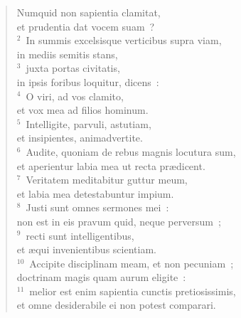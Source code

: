\begin{flushleft}\begin{verse}\vspace{-19pt}Numquid non sapientia clamitat,\\ et prudentia dat vocem suam~?\\
${}^{2}$~In summis excelsisque verticibus supra viam,\\ in mediis semitis stans,\\
${}^{3}$~juxta portas civitatis,\\ in ipsis foribus loquitur, dicens~:\\
${}^{4}$~O viri, ad vos clamito,\\ et vox mea ad filios hominum.\\
${}^{5}$~Intelligite, parvuli, astutiam,\\ et insipientes, animadvertite.\\
${}^{6}$~Audite, quoniam de rebus magnis locutura sum,\\ et aperientur labia mea ut recta pr\ae dicent.\\
${}^{7}$~Veritatem meditabitur guttur meum,\\ et labia mea detestabuntur impium.\\
${}^{8}$~Justi sunt omnes sermones mei~:\\ non est in eis pravum quid, neque perversum~;\\
${}^{9}$~recti sunt intelligentibus,\\ et \ae qui invenientibus scientiam.\\
${}^{10}$~Accipite disciplinam meam, et non pecuniam~;\\ doctrinam magis quam aurum eligite~:\\
${}^{11}$~melior est enim sapientia cunctis pretiosissimis,\\ et omne desiderabile ei non potest comparari.\end{verse}\end{flushleft}


